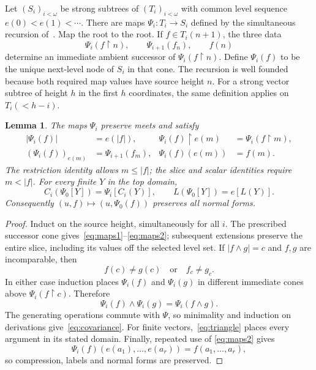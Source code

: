 \documentclass{article}
\numberwithin{equation}{section}
\newtheorem{lemma}[theorem]{Lemma}
\theoremstyle{definition}
\newcommand{\res}{\mathbin{\upharpoonright}}
\begin{document}
Let $(S_i)_{i<\omega}$ be strong subtrees of $(T_i)_{i<\omega}$ with common
level sequence $e(0)<e(1)<\cdots$. There are maps $\Psi_i:T_i\to S_i$
defined by the simultaneous recursion of~\cite[Lemma~3.3]{InfiniteLanguages}.
Map the root to the root. If $f\in T_i(n+1)$, the three data
\[
\Psi_i(f\res n),\qquad \Psi_{i+1}(f_n),\qquad f(n)
\]
determine an immediate ambient successor of $\Psi_i(f\res n)$. Define
$\Psi_i(f)$ to be the unique next-level node of $S_i$ in that cone.
The recursion is well founded because both required map values have source
height $n$. For a strong vector subtree of height $h$ in the first $h$
coordinates, the same definition applies on $T_i(<h-i)$.

\begin{lemma}\label{lem:maps}
The maps $\Psi_i$ preserve meets and satisfy
\begin{align}
|\Psi_i(f)|&=e(|f|), &
\Psi_i(f)\res e(m)&=\Psi_i(f\res m),\label{eq:maps1}\\
(\Psi_i(f))_{e(m)}&=\Psi_{i+1}(f_m), &
\Psi_i(f)(e(m))&=f(m).\label{eq:maps2}
\end{align}
The restriction identity allows $m\leq|f|$; the slice and scalar identities
require $m<|f|$. For every finite $Y$ in the top domain,
\begin{equation}\label{eq:covariance}
C_i(\Psi_0[Y])=\Psi_i[C_i(Y)],\qquad
L(\Psi_0[Y])=e[L(Y)].
\end{equation}
Consequently $(u,f)\mapsto(u,\Psi_0(f))$ preserves all normal forms.
\end{lemma}

\begin{proof}
Induct on the source height, simultaneously for all $i$. The prescribed
successor cone gives~\eqref{eq:maps1}--\eqref{eq:maps2}; subsequent extensions
preserve the entire slice, including its values off the selected level set.
If $|f\wedge g|=c$ and $f,g$ are incomparable, then
\[
 f(c)\ne g(c)\quad\text{or}\quad f_c\ne g_c.
\]
In either case induction places $\Psi_i(f)$ and $\Psi_i(g)$ in different
immediate cones above $\Psi_i(f\res c)$. Therefore
\[
 \Psi_i(f)\wedge\Psi_i(g)=\Psi_i(f\wedge g).
\]
The generating operations commute with $\Psi$, so minimality and induction
on derivations give~\eqref{eq:covariance}. For finite vectors,~\eqref{eq:triangle}
places every argument in its stated domain. Finally, repeated use of
\eqref{eq:maps2} gives
\[
 \Psi_i(f)(e(a_1),\ldots,e(a_r))=f(a_1,\ldots,a_r),
\]
so compression, labels and normal forms are preserved.
\end{proof}
\end{document}
